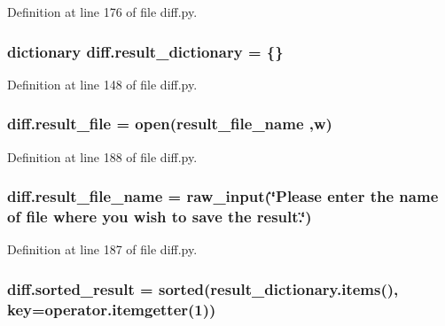 Definition at line 176 of file diff.\+py.

\subsubsection[{\texorpdfstring{result\+\_\+dictionary}{result_dictionary}}]{\setlength{\rightskip}{0pt plus 5cm}dictionary diff.\+result\+\_\+dictionary = \{\}}\hypertarget{namespacediff_a08d29f91abd1bc75aa7d8ecb3aa39c91}{}\label{namespacediff_a08d29f91abd1bc75aa7d8ecb3aa39c91}


Definition at line 148 of file diff.\+py.

\subsubsection[{\texorpdfstring{result\+\_\+file}{result_file}}]{\setlength{\rightskip}{0pt plus 5cm}diff.\+result\+\_\+file = open({\bf result\+\_\+file\+\_\+name} ,\textquotesingle{}w\textquotesingle{})}\hypertarget{namespacediff_aa1be62f435ce37ca93ba61d4ad88c0c9}{}\label{namespacediff_aa1be62f435ce37ca93ba61d4ad88c0c9}


Definition at line 188 of file diff.\+py.

\subsubsection[{\texorpdfstring{result\+\_\+file\+\_\+name}{result_file_name}}]{\setlength{\rightskip}{0pt plus 5cm}diff.\+result\+\_\+file\+\_\+name = raw\+\_\+input(\char`\"{}Please enter the name of {\bf file} where you wish to save the result.\char`\"{})}\hypertarget{namespacediff_a15a863df81a6f3099b088f9f52808389}{}\label{namespacediff_a15a863df81a6f3099b088f9f52808389}


Definition at line 187 of file diff.\+py.

\subsubsection[{\texorpdfstring{sorted\+\_\+result}{sorted_result}}]{\setlength{\rightskip}{0pt plus 5cm}diff.\+sorted\+\_\+result = sorted(result\+\_\+dictionary.\+items(), key=operator.\+itemgetter(1))}\hypertarget{namespacediff_a3b4c2771da02846b61219801d8016b40}{}\label{namespacediff_a3b4c2771da02846b61219801d8016b40}


